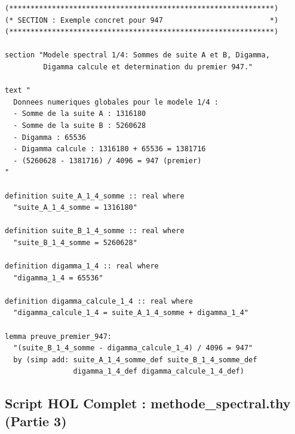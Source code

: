 \documentclass[a4paper,11pt]{article}
\begin{document}
\begin{holcode}[title={\textcolor{white}{Fichier : methode\_spectral.thy -- Partie 2/4}}]
\begin{lstlisting}
(**************************************************************)
(* SECTION : Exemple concret pour 947                         *)
(**************************************************************)

section "Modele spectral 1/4: Sommes de suite A et B, Digamma, 
         Digamma calcule et determination du premier 947."

text "
  Donnees numeriques globales pour le modele 1/4 :
  - Somme de la suite A : 1316180
  - Somme de la suite B : 5260628
  - Digamma : 65536
  - Digamma calcule : 1316180 + 65536 = 1381716
  - (5260628 - 1381716) / 4096 = 947 (premier)
"

definition suite_A_1_4_somme :: real where
  "suite_A_1_4_somme = 1316180"

definition suite_B_1_4_somme :: real where
  "suite_B_1_4_somme = 5260628"

definition digamma_1_4 :: real where
  "digamma_1_4 = 65536"

definition digamma_calcule_1_4 :: real where
  "digamma_calcule_1_4 = suite_A_1_4_somme + digamma_1_4"

lemma preuve_premier_947:
  "(suite_B_1_4_somme - digamma_calcule_1_4) / 4096 = 947"
  by (simp add: suite_A_1_4_somme_def suite_B_1_4_somme_def
                digamma_1_4_def digamma_calcule_1_4_def)
\end{lstlisting}
\end{holcode}

\newpage
\subsection{Script HOL Complet : methode\_spectral.thy (Partie 3)}
\end{document}
